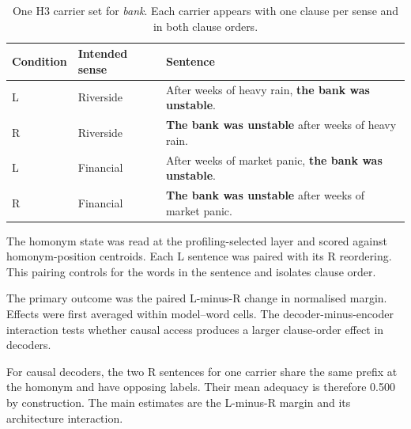 \documentclass[conference]{IEEEtran}
\newcommand{\resultstableformat}{%
  \footnotesize
  \renewcommand{\arraystretch}{1.12}%
  \setlength{\extrarowheight}{0.7pt}%
}
\begin{document}
\begin{table}[!t]
    \centering
    \resultstableformat
    \caption{One H3 carrier set for \emph{bank}. Each carrier appears with one
    clause per sense and in both clause orders.}
    \label{tab:h3-bank-stimuli}
    \begin{tabular}{p{}p{}p{}}
    \hline
    Condition & Intended sense & Sentence \\
    \hline
    L & Riverside &
    After weeks of heavy rain, \textbf{the bank was unstable}. \\

    R & Riverside &
    \textbf{The bank was unstable} after weeks of heavy rain. \\

    L & Financial &
    After weeks of market panic, \textbf{the bank was unstable}. \\

    R & Financial &
    \textbf{The bank was unstable} after weeks of market panic. \\
    \hline
    \end{tabular}
\end{table}

The homonym state was read at the profiling-selected layer and scored against
homonym-position centroids. Each L sentence was paired with its R reordering.
This pairing controls for the words in the sentence and isolates clause order.

The primary outcome was the paired L-minus-R change in normalised margin.
Effects were first averaged within model--word cells. The
decoder-minus-encoder interaction tests whether causal access produces a
larger clause-order effect in decoders.

For causal decoders, the two R sentences for one carrier share the same prefix
at the homonym and have opposing labels. Their mean adequacy is therefore 0.500
by construction. The main estimates are the L-minus-R margin and its
architecture interaction.
\end{document}
